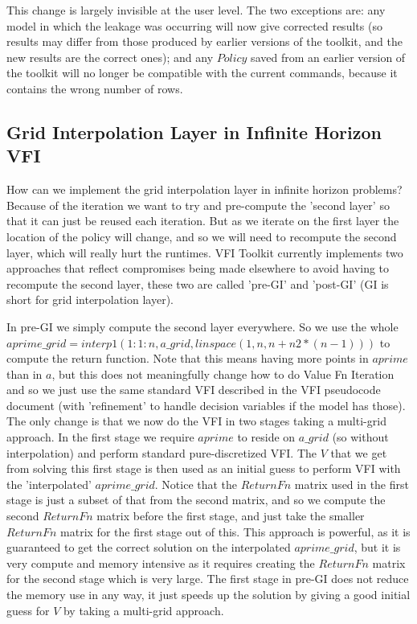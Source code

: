 \documentclass[11pt,fleqn]{article}
\begin{document}
This change is largely invisible at the user level. The two exceptions are: any model in which the leakage was occurring will now give corrected results (so results may differ from those produced by earlier versions of the toolkit, and the new results are the correct ones); and any $Policy$ saved from an earlier version of the toolkit will no longer be compatible with the current commands, because it contains the wrong number of rows.

\subsection*{Grid Interpolation Layer in Infinite Horizon VFI}
How can we implement the grid interpolation layer in infinite horizon problems? Because of the iteration we want to try and pre-compute the 'second layer' so that it can just be reused each iteration. But as we iterate on the first layer the location of the policy will change, and so we will need to recompute the second layer, which will really hurt the runtimes. VFI Toolkit currently implements two approaches that reflect compromises being made elsewhere to avoid having to recompute the second layer, these two are called 'pre-GI' and 'post-GI' (GI is short for grid interpolation layer).

In pre-GI we simply compute the second layer everywhere. So we use the whole $aprime\_{}grid=interp1(1:1:n,a\_{}grid,linspace(1,n,n+n2*(n-1)))$ to compute the return function. Note that this means having more points in $aprime$ than in $a$, but this does not meaningfully change how to do Value Fn Iteration and so we just use the same standard VFI described in the VFI pseudocode document (with 'refinement' to handle decision variables if the model has those). The only change is that we now do the VFI in two stages taking a multi-grid approach. In the first stage we require $aprime$ to reside on $a\_{}grid$ (so without interpolation) and perform standard pure-discretized VFI. The $V$ that we get from solving this first stage is then used as an initial guess to perform VFI with the 'interpolated' $aprime\_{}grid$. Notice that the $ReturnFn$ matrix used in the first stage is just a subset of that from the second matrix, and so we compute the second $ReturnFn$ matrix before the first stage, and just take the smaller $ReturnFn$ matrix for the first stage out of this. This approach is powerful, as it is guaranteed to get the correct solution on the interpolated $aprime\_{}grid$, but it is very compute and memory intensive as it requires creating the $ReturnFn$ matrix for the second stage which is very large. The first stage in pre-GI does not reduce the memory use in any way, it just speeds up the solution by giving a good initial guess for $V$ by taking a multi-grid approach.
\end{document}
